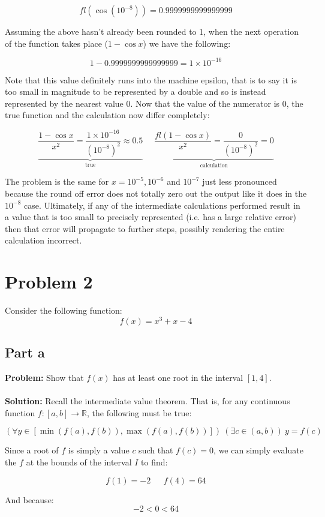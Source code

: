 \documentclass{article}
\begin{document}
$$fl(\cos(10^{-8}))=0.9999999999999999$$

Assuming the above hasn't already been rounded to 1, when the next operation of the function takes place ($1-\cos x$) we have the following:

$$1-0.9999999999999999=1\times10^{-16}$$

Note that this value definitely runs into the machine epsilon, that is to say it is too small in magnitude to be represented by a double and so is instead represented by the nearest value 0. Now that the value of the numerator is 0, the true function and the calculation now differ completely:

$$\underbrace{\frac{1-\cos x}{x^2}=\frac{1\times10^{-16}}{(10^{-8})^2}\approx0.5}_{\text{true}}\ \ \ \ \ \ \underbrace{\frac{fl(1-\cos x)}{x^2}=\frac{0}{(10^{-8})^2}=0}_{\text{calculation}}$$

The problem is the same for $x=10^{-5},10^{-6}$ and $10^{-7}$ just less pronounced because the round off error does not totally zero out the output like it does in the $10^{-8}$ case. Ultimately, if any of the intermediate calculations performed result in a value that is too small to precisely represented (i.e. has a large relative error) then that error will propagate to further steps, possibly rendering the entire calculation incorrect.

\section*{Problem 2}
Consider the following function:
$$f(x)=x^3+x-4$$

\subsection*{Part a}
\textbf{Problem:} Show that $f(x)$ has at least one root in the interval $[1,4]$.
\\\\
\textbf{Solution:} Recall the intermediate value theorem. That is, for any continuous function $f:[a,b]\to\mathbb R$, the following must be true:

$$(\forall y\in[\min{(f(a),f(b))},\max{(f(a),f(b))}])\ (\exists c\in(a,b))\ y=f(c)$$

Since a root of $f$ is simply a value $c$ such that $f(c)=0$, we can simply evaluate the $f$ at the bounds of the interval $I$ to find:

$$f(1)=-2\ \ \ \ \ \ \  f(4)=64$$

And because:
$$-2<0<64$$
\end{document}
